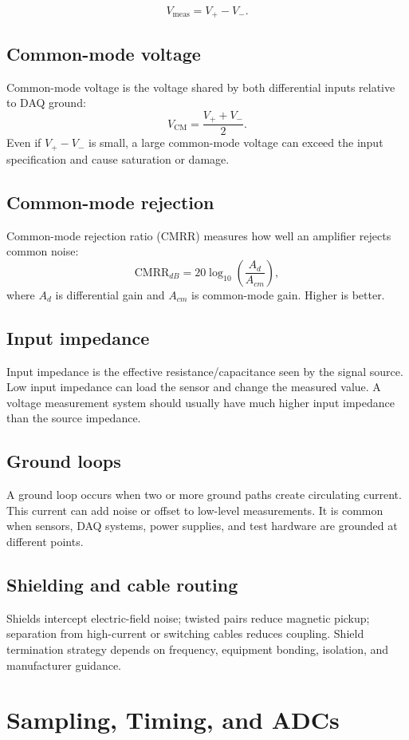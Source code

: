 \documentclass[11pt]{article}
\begin{document}
\[
V_{\mathrm{meas}} = V_+ - V_-.
\]

\subsection{Common-mode voltage}
Common-mode voltage is the voltage shared by both differential inputs relative
to DAQ ground:
\[
V_{\mathrm{CM}} = \frac{V_+ + V_-}{2}.
\]
Even if \(V_+ - V_-\) is small, a large common-mode voltage can exceed the
input specification and cause saturation or damage.

\subsection{Common-mode rejection}
Common-mode rejection ratio (CMRR) measures how well an amplifier rejects common
noise:
\[
\mathrm{CMRR}_{dB}=20\log_{10}\left(\frac{A_d}{A_{cm}}\right),
\]
where \(A_d\) is differential gain and \(A_{cm}\) is common-mode gain. Higher is
better.

\subsection{Input impedance}
Input impedance is the effective resistance/capacitance seen by the signal
source. Low input impedance can load the sensor and change the measured value.
A voltage measurement system should usually have much higher input impedance
than the source impedance.

\subsection{Ground loops}
A ground loop occurs when two or more ground paths create circulating current.
This current can add noise or offset to low-level measurements. It is common
when sensors, DAQ systems, power supplies, and test hardware are grounded at
different points.

\subsection{Shielding and cable routing}
Shields intercept electric-field noise; twisted pairs reduce magnetic pickup;
separation from high-current or switching cables reduces coupling. Shield
termination strategy depends on frequency, equipment bonding, isolation, and
manufacturer guidance.

\section{Sampling, Timing, and ADCs}
\end{document}
